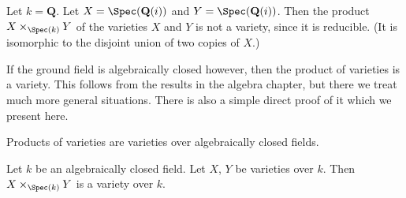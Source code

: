 \begin{example}
\label{example-product-not-a-variety}
Let $k = \mathbf{Q}$. Let $X = \Spec(\mathbf{Q}(i))$
and $Y = \Spec(\mathbf{Q}(i))$. Then the product
$X \times_{\Spec(k)} Y$ of the varieties $X$ and $Y$
is not a variety, since it is reducible. (It is isomorphic
to the disjoint union of two copies of $X$.)
\end{example}

\noindent
If the ground field is algebraically closed however, then the
product of varieties is a variety. This follows from the results
in the algebra chapter, but there we treat much more general situations.
There is also a simple direct proof of it which we present here.

\begin{lemma}
\label{lemma-product-varieties}
\begin{slogan}
Products of varieties are varieties over algebraically closed fields.
\end{slogan}
Let $k$ be an algebraically closed field.
Let $X$, $Y$ be varieties over $k$.
Then $X \times_{\Spec(k)} Y$ is a variety over $k$.
\end{lemma}

